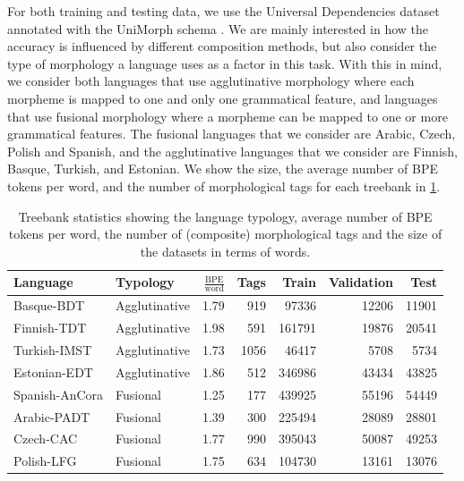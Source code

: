 \documentclass[11pt]{article}
\newcommand\citep{\cite}
\begin{document}
            For both training and testing data, we use the Universal
     Dependencies dataset \citep{nivre2018} annotated with the
     UniMorph schema \citep{mccarthy2018marrying}.  We are mainly
     interested in how the accuracy is influenced by different
     composition methods, but also consider the type of morphology a
     language uses as a factor in this task.
%
    With this in mind, we consider both
     languages that use agglutinative morphology where each morpheme
     is mapped to one and only one grammatical feature, and
     languages that use fusional morphology where a morpheme can be
     mapped to one or more grammatical features. 
%
           	The fusional languages that we consider are Arabic, Czech,
     Polish and Spanish, and the agglutinative languages that we
     consider are Finnish, Basque, Turkish, and Estonian.  We show the
     size, the average number of BPE tokens per word, and the number of
     morphological tags for each treebank in \cref{tab:data}.
    
    
    \begin{table}
		\centering
		\begin{tabular}{l|lrrrrr}
			Language & Typology & $\frac{\textrm{BPE}}{\textrm{word}}$ & Tags & Train & Validation & Test \\
			\hline
			Basque-BDT      & Agglutinative & 1.79 & 919 & 97336 & 12206 & 11901 \\
			Finnish-TDT     & Agglutinative & 1.98 & 591 & 161791 & 19876 & 20541 \\
			Turkish-IMST    & Agglutinative & 1.73 & 1056 & 46417 & 5708 & 5734 \\
			Estonian-EDT    & Agglutinative & 1.86 & 512 & 346986 & 43434 & 43825 \\
    		Spanish-AnCora  & Fusional & 1.25 & 177 & 439925 & 55196 & 54449 \\ 
            Arabic-PADT     & Fusional & 1.39 & 300 & 225494 & 28089 & 28801  \\
			Czech-CAC       & Fusional & 1.77 & 990 & 395043 & 50087 & 49253 \\
			Polish-LFG      & Fusional & 1.75 & 634 & 104730 & 13161 & 13076 \\
        \end{tabular}
        \caption{\label{tab:data} Treebank statistics showing the
     language typology, average number of BPE tokens per word, the
     number of (composite) morphological tags and the size of the
     datasets in terms of words.}
	\end{table}
    
\end{document}
